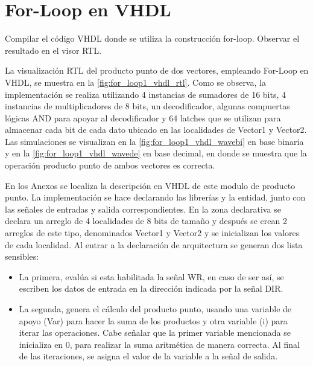\section{For-Loop en VHDL \label{sec:s1}}

\begin{center}
	\begin{minipage}{12cm}
		\begin{tcolorbox}[title=Actividad 1]
			Compilar el código VHDL donde se utiliza la construcción for-loop. Observar el resultado en el visor RTL.
		\end{tcolorbox}	
	\end{minipage}
\end{center}

La visualización RTL del producto punto de dos vectores, empleando For-Loop en VHDL, se muestra en la \autoref{fig:for_loop1_vhdl_rtl}. Como se observa, la implementación se realiza utilizando 4 instancias de sumadores de 16 bits, 4 instancias de multiplicadores de 8 bits, un decodificador, algunas compuertas lógicas AND para apoyar al decodificador y 64 latches que se utilizan para almacenar cada bit de cada dato ubicado en las localidades de Vector1 y Vector2. Las simulaciones se visualizan en la \autoref{fig:for_loop1_vhdl_wavebi} en base binaria y en la \autoref{fig:for_loop1_vhdl_wavede} en base decimal, en donde se muestra que la operación producto punto de ambos vectores es correcta.

En los Anexos se localiza la descripción en VHDL de este modulo de producto punto. La implementación se hace declarando las librerías y la entidad, junto con las señales de entradas y salida correspondientes. En la zona declarativa se declara un arreglo de 4 localidades de 8 bits de tamaño y después se crean 2 arreglos de este tipo, denominados Vector1 y Vector2 y se inicializan los valores de cada localidad. Al entrar a la declaración de arquitectura se generan dos lista sensibles:

\begin{itemize}
	\item La primera, evalúa si esta habilitada la señal WR, en caso de ser así, se escriben los datos de entrada en la dirección indicada por la señal DIR.
	\item La segunda, genera el cálculo del producto punto, usando una variable de apoyo (Var) para hacer la suma de los productos y otra variable (i) para iterar las operaciones. Cabe señalar que la primer variable mencionada se inicializa en 0, para realizar la suma aritmética de manera correcta. Al final de las iteraciones, se asigna el valor de la variable a la señal de salida.
\end{itemize}

